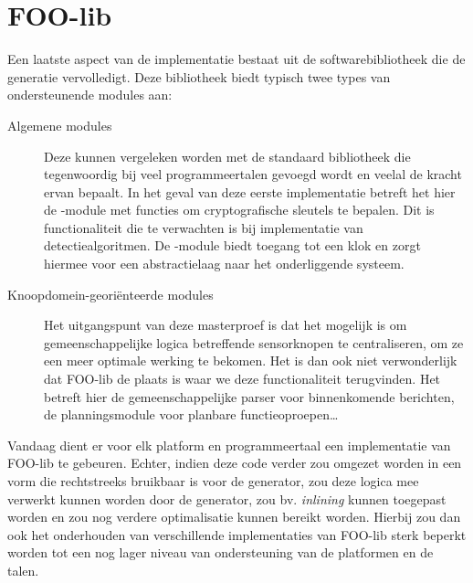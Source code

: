 
\section{FOO-lib}
\label{section:devel-foo-lib}

Een laatste aspect van de implementatie bestaat uit de softwarebibliotheek die
de generatie vervolledigt. Deze bibliotheek biedt typisch twee types van
ondersteunende modules aan:

\begin{description}

\item[Algemene modules] Deze kunnen vergeleken worden met de standaard
bibliotheek die tegenwoordig bij veel programmeertalen gevoegd wordt en veelal
de kracht ervan bepaalt. In het geval van deze eerste implementatie betreft het
hier de -module met functies om cryptografische sleutels te
bepalen. Dit is functionaliteit die te verwachten is bij implementatie van
detectiealgoritmen. De -module biedt toegang tot een klok en zorgt
hiermee voor een abstractielaag naar het onderliggende systeem.

\item[Knoopdomein-geori\"enteerde modules] Het uitgangspunt van deze
masterproef is dat het mogelijk is om gemeenschappelijke logica betreffende
sensorknopen te centraliseren, om ze een meer optimale werking te bekomen. Het
is dan ook niet verwonderlijk dat FOO-lib de plaats is waar we deze
functionaliteit terugvinden. Het betreft hier de gemeenschappelijke parser voor
binnenkomende berichten, de planningsmodule voor planbare functieoproepen\dots

\end{description}

Vandaag dient er voor elk platform en programmeertaal een implementatie van
FOO-lib te gebeuren. Echter, indien deze code verder zou omgezet worden in een
vorm die rechtstreeks bruikbaar is voor de generator, zou deze logica mee
verwerkt kunnen worden door de generator, zou bv. \emph{inlining} kunnen
toegepast worden en zou nog verdere optimalisatie kunnen bereikt worden.
Hierbij zou dan ook het onderhouden van verschillende implementaties van
FOO-lib sterk beperkt worden tot een nog lager niveau van ondersteuning van de
platformen en de talen.
